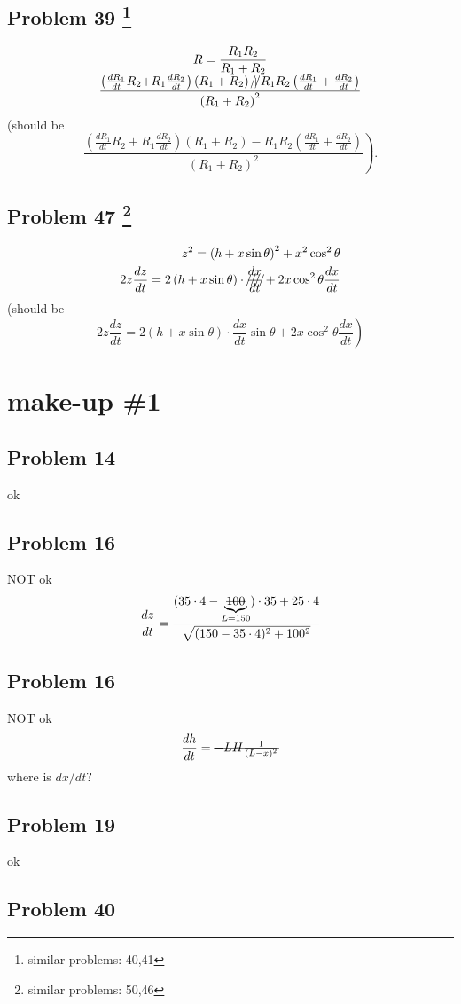\documentclass[10pt]{article} %
\begin{document}
\subsection*{Problem 39 \footnote{similar problems: 40,41}}
\begin{equation*}
  \begin{array}[]{c}
    \displaystyle R=\frac{R_1R_2}{R_1+R_2}\\
    \mbox{{$\displaystyle \frac{\left( \frac{dR_1}{dt}R_2\mbox{${+}$}R_1\frac{dR_2}{dt} \right)\left( R_1+R_2 \right)
    \mbox{\xout{$+$}}
    R_1R_2\left( \frac{dR_1}{dt}+\frac{dR_2}{dt} \right)}{\left( R_1+R_2 \right)^2}$}}
  \end{array}
\end{equation*}
  (should be
  \begin{equation*}
    \left.\frac{\left( \frac{dR_1}{dt}R_2\mbox{${+}$}R_1\frac{dR_2}{dt} \right)\left( R_1+R_2 \right)
    -
    R_1R_2\left( \frac{dR_1}{dt}+\frac{dR_2}{dt} \right)}{\left( R_1+R_2 \right)^2}\right).
  \end{equation*}
  \subsection*{Problem 47 \footnote{similar problems: 50,46}}
\begin{align*}
  z^2=\left( h+x\sin\theta \right)^2+x^2\cos^2\theta\\
  2z\frac{dz}{dt}=2\left( h+x\sin\theta \right)\cdot\mbox{\xout{$\displaystyle\frac{dx}{dt}$}}+
  2x\cos^2\theta\frac{dx}{dt}
\end{align*}
(should be\begin{equation*}
  \left.
  2z\frac{dz}{dt}=2\left( h+x\sin\theta \right)\cdot
  \mbox{{$\displaystyle\frac{dx}{dt}$}}\sin\theta
  +
  2x\cos^2\theta\frac{dx}{dt}
  \right)
\end{equation*}
\section*{make-up \#1}
\subsection*{Problem 14}
ok
\subsection*{Problem 16}
NOT ok
\begin{equation*}
	\frac{dz}{dt}=\frac{(35\cdot4-\underbrace{\mbox{\sout{100}}}_{L=150})
	\cdot35+25\cdot4}{\sqrt{(150-35\cdot4)^2+100^2}}
\end{equation*}
\subsection*{Problem 16}
NOT ok
\begin{equation*}
	\frac{dh}{dt}=\mbox{\sout{$-LH\frac{1}{(L-x)^2}$}}
\end{equation*}
where is $dx/dt$?
\subsection*{Problem 19}
ok
\subsection*{Problem 40}
\end{document}
